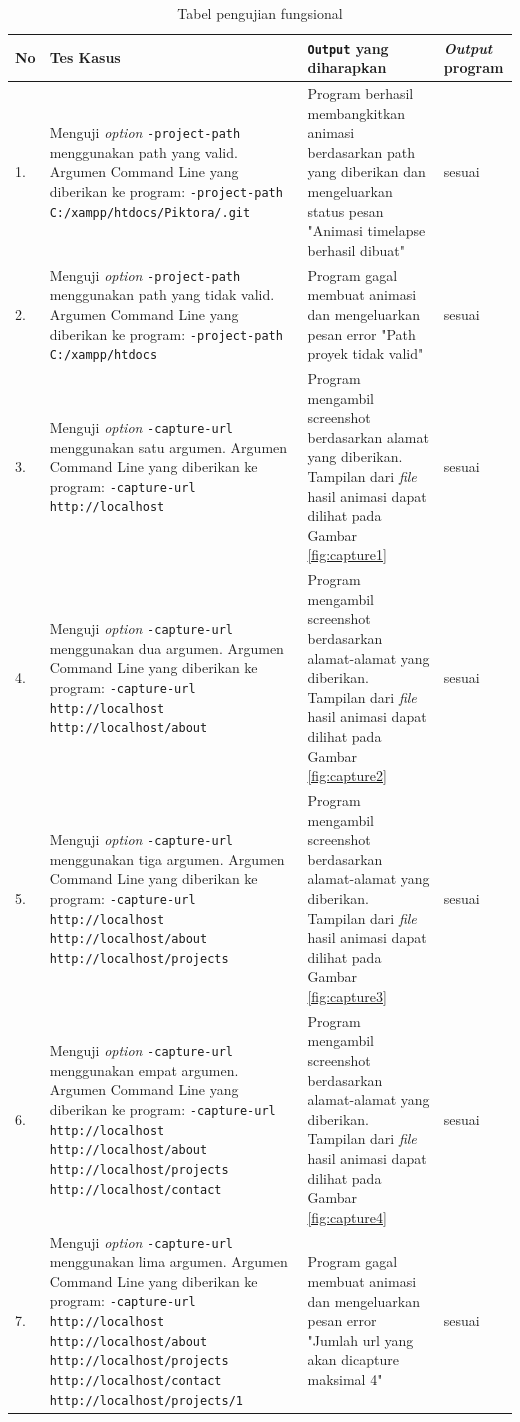 \begin{table}[htbp]
	\centering
	\caption{Tabel pengujian fungsional}
	
		\begin{tabular}{|p{0.3cm}|>{\raggedright} p{5.5 cm}| p{7 cm}| p{3 cm}|} \hline
		No & Tes Kasus	& \texttt{Output} yang diharapkan & \textit{Output} program \\ \hline
		1. & Menguji \textit{option} \texttt{-project-path} menggunakan path yang valid. Argumen Command Line yang diberikan ke program: \texttt{-project-path C:/xampp/htdocs/Piktora/.git} & Program berhasil membangkitkan animasi berdasarkan path yang diberikan dan mengeluarkan status pesan "Animasi timelapse berhasil dibuat" & sesuai \\ \hline
		2. & Menguji \textit{option} \texttt{-project-path} menggunakan path yang tidak valid. Argumen Command Line yang diberikan ke program: \texttt{-project-path C:/xampp/htdocs}  & Program gagal membuat animasi dan mengeluarkan pesan error "Path proyek tidak valid"  & sesuai \\ \hline
		3. & Menguji \textit{option} \texttt{-capture-url} menggunakan satu argumen. Argumen Command Line yang diberikan ke program:  \texttt{-capture-url http://localhost} & Program mengambil screenshot berdasarkan alamat yang diberikan. Tampilan dari \textit{file} hasil animasi dapat dilihat pada Gambar \ref{fig:capture1}  & sesuai	\\ \hline
		4. & Menguji \textit{option} \texttt{-capture-url} menggunakan dua argumen. Argumen Command Line yang diberikan ke program:  \texttt{-capture-url http://localhost http://localhost/about} & Program mengambil screenshot berdasarkan alamat-alamat yang diberikan. Tampilan dari \textit{file} hasil animasi dapat dilihat pada Gambar \ref{fig:capture2}  & sesuai \\ \hline
		5. & Menguji \textit{option} \texttt{-capture-url} menggunakan tiga argumen. Argumen Command Line yang diberikan ke program:  \texttt{-capture-url http://localhost http://localhost/about http://localhost/projects} & Program mengambil screenshot berdasarkan alamat-alamat yang diberikan. Tampilan dari \textit{file} hasil animasi dapat dilihat pada Gambar \ref{fig:capture3}   & sesuai\\ \hline
		6. & Menguji \textit{option} \texttt{-capture-url} menggunakan empat argumen. Argumen Command Line yang diberikan ke program:  \texttt{-capture-url http://localhost http://localhost/about http://localhost/projects http://localhost/contact} & Program mengambil screenshot berdasarkan alamat-alamat yang diberikan. Tampilan dari \textit{file} hasil animasi dapat dilihat pada Gambar \ref{fig:capture4}  & sesuai \\ \hline
		7. & Menguji \textit{option} \texttt{-capture-url} menggunakan lima argumen. Argumen Command Line yang diberikan ke program:  \texttt{-capture-url http://localhost http://localhost/about http://localhost/projects http://localhost/contact http://localhost/projects/1}& Program gagal membuat animasi dan mengeluarkan pesan error "Jumlah url yang akan dicapture maksimal 4" & sesuai \\ \hline
		

\end{tabular}
\end{table}
